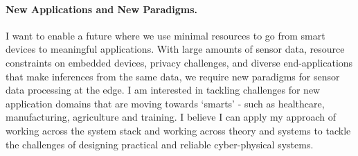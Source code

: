 \documentclass[10pt]{article}
\begin{document}

\paragraph{New Applications and New Paradigms. }
I want to enable a future where we use minimal resources to go from smart devices to meaningful applications. 
With large amounts of sensor data, resource constraints on embedded devices, privacy challenges, and diverse end-applications that make	 inferences from the same data, we require new paradigms for 
sensor data processing at the edge. %
I am interested in tackling challenges for new application domains that are moving towards `smarts' - such as healthcare, manufacturing, agriculture and training. 
I believe I can apply my approach of working across the system stack and working across theory and systems %
to tackle the challenges of designing practical and reliable cyber-physical systems. 








\footnotesize


\end{document}
